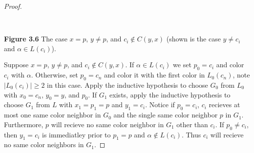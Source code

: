 \documentclass[11pt,letter]{article}
\begin{document}
\begin{proof}
\begin{center}
$\quad$
\hfill\\
\textbf{Figure 3.6} The case $x=p$, $y\ne p$, and $c_i\not\in C(y,x)$ (shown is the case $y\ne c_i$ and
$\alpha\in L(c_i)$).
\end{center}

\noindent Suppose $x=p$, $y\ne p$, and $c_i\not\in C(y,x)$. If
$\alpha\in L(c_i)$ we set $p_0=c_i$ and color $c_i$ with $\alpha$. Otherwise, set $p_0=c_n$ and color it with
the first color in $L_0(c_n)$, note $|L_0(c_i)|\ge 2$ in this case. Apply the inductive hypothesis to
choose $G_0$ from $L_0$ with $x_0=c_n$, $y_0=y$, and $p_0$. If $G_1$ exists, apply the inductive
hypothesis to choose $G_1$ from $L$ with $x_1=p_1=p$ and $y_1=c_i$. Notice if $p_0=c_i$, $c_i$ recieves at most
one same color neighbor in $G_0$ and the single same color neighbor $p$ in $G_1$. Furthermore, $p$ will recieve no
same color neighbor in $G_1$ other than $c_i$. If $p_0\ne c_i$, then $y_1=c_i$ is immediatley prior to
$p_1=p$ and $\alpha\not\in L(c_i)$. Thus $c_i$ will recieve no same color neighbors in $G_1$.


\end{proof}
\end{document}
